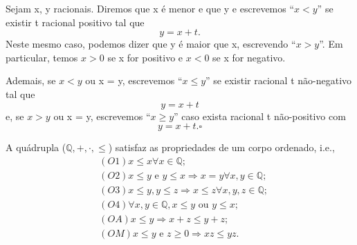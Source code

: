 \documentclass[analysis_notes.tex]{subfiles}
\begin{document}
\begin{def*}
	Sejam x, y racionais. Diremos que x \'e menor e que y e escrevemos ``$x < y$'' se existir t racional positivo tal que
	$$
		y = x + t.
	$$
	Neste mesmo caso, podemos dizer que y \'e maior que x, escrevendo ``$x > y$''. Em particular, temos $x > 0$ se x for positivo e
	$x < 0$ se x for negativo.

	Ademais, se $x < y$ ou x = y, escrevemos ``$x \leq{y}$'' se existir racional t n\~ao-negativo tal que
	$$
		y = x + t
	$$
	e, se $x > y$ ou x = y, escrevemos ``$x \geq{y}$'' caso exista racional t n\~ao-positivo com
	$$
		y = x + t. \square
	$$
\end{def*}
A qu\'adrupla ($\mathbb{Q}, +, \cdot, \leq{}$) satisfaz as propriedades de um corpo ordenado, i.e.,
\begin{align*}
	 & (O1) x \leq{x}\forall x\in \mathbb{Q};                                          \\
	 & (O2) x\leq{y} \text{ e } y \leq{x}\Rightarrow x = y \forall x, y\in \mathbb{Q}; \\
	 & (O3) x \leq{y}, y \leq{z}\Rightarrow x \leq{z}\forall x, y, z\in \mathbb{Q};    \\
	 & (O4)\forall x, y \in \mathbb{Q}, x \leq{y} \text{ ou } y \leq{x};               \\
	 & (OA) x \leq{y}\Rightarrow x + z \leq{y + z};                                    \\
	 & (OM) x \leq{y} \text{ e } z \geq{0}\Rightarrow xz \leq{yz}.
\end{align*}
\end{document}
